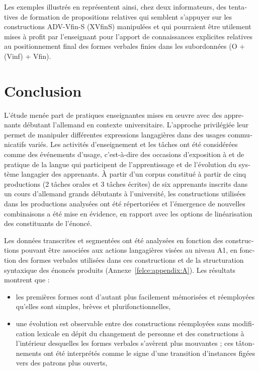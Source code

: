 \documentclass[output=paper]{langscibook}
\begin{document}
\begin{otherlanguage}{french}
Les exemples illustrés en  représentent ainsi, chez deux informateurs, des tentatives de formation de propositions relatives qui semblent s’appuyer sur les constructions ADV-Vfin-S (XVfinS) manipulées et qui pourraient être utilement mises à profit par l’enseignant pour l’apport de connaissances explicites relatives au positionnement final des formes verbales finies dans les subordonnées (O + (Vinf) + Vfin).

\section{Conclusion}\label{sec:felce:8}

L’étude menée part de pratiques enseignantes mises en œuvre avec des apprenants débutant l’allemand en contexte universitaire. L’approche privilégiée leur permet de manipuler différentes expressions langagières dans des usages communicatifs variés. Les activités d’enseignement et les tâches ont été considérées comme des événements d’usage, c’est-à-dire des occasions d’exposition à et de pratique de la langue qui participent de l’apprentissage et de l’évolution du système langagier des apprenants. À partir d’un corpus constitué à partir de cinq productions (2 tâches orales et 3 tâches écrites) de six apprenants inscrits dans un cours d’allemand grands débutants à l’université, les constructions utilisées dans les productions analysées ont été répertoriées et l’émergence de nouvelles combinaisons a été mise en évidence, en rapport avec les options de linéarisation des constituants de l’énoncé.

\begin{sloppypar}
Les données transcrites et segmentées ont été analysées en fonction des constructions pouvant être associées aux actions langagières visées au niveau A1, en fonction des formes verbales utilisées dans ces constructions et de la structuration syntaxique des énoncés produits (Annexe~\ref{felce:appendix:A}). Les résultats montrent que : 
\end{sloppypar}

\begin{itemize}\sloppy
\item les premières formes sont d’autant plus facilement mémorisées et réemployées qu’elles sont simples, brèves et plurifonctionnelles,

\item une évolution est observable entre des constructions réemployées sans modification lexicale en dépit du changement de personne et des constructions à l’intérieur desquelles les formes verbales s’avèrent plus mouvantes ; ces tâtonnements ont été interprétés comme le signe d’une transition d’instances figées vers des patrons plus ouverts,


\end{itemize}
\end{otherlanguage}
\end{document}
